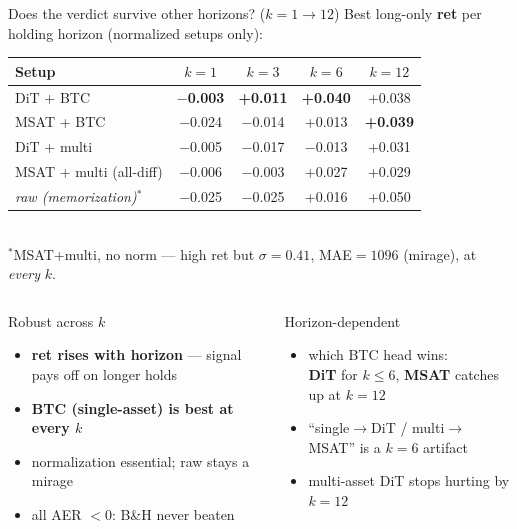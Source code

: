 \documentclass[10pt,aspectratio=169]{beamer}
\newcommand{\gd}[1]{\textbf{\textcolor{good}{#1}}}
\newcommand{\bd}[1]{\textcolor{bad}{#1}}
\begin{document}
\begin{frame}{Does the verdict survive other horizons? \hfill\normalfont\small($k{=}1\!\to\!12$)}
\centering\small
\setlength{\tabcolsep}{9pt}
Best long-only \textbf{ret} per holding horizon (normalized setups only):
\\[0.5em]
\begin{tabular}{@{}l cccc@{}}
\toprule
Setup & $k{=}1$ & $k{=}3$ & $k{=}6$ & $k{=}12$ \\ \midrule
DiT + BTC                & \gd{$-$0.003} & \gd{+0.011} & \gd{+0.040} & +0.038 \\
MSAT + BTC               & $-$0.024 & $-$0.014 & +0.013 & \gd{+0.039} \\
DiT + multi              & $-$0.005 & $-$0.017 & $-$0.013 & +0.031 \\
MSAT + multi (all-diff)  & $-$0.006 & $-$0.003 & +0.027 & +0.029 \\ \midrule
\emph{raw (memorization)}$^\ast$ & \bd{$-$0.025} & \bd{$-$0.025} & \bd{+0.016} & \bd{+0.050} \\
\bottomrule
\end{tabular}
\\[0.5em]
{\scriptsize $^\ast$MSAT+multi, no norm --- high ret but $\sigma{=}0.41$, MAE${=}1096$ (mirage), at \emph{every} $k$.}
\\[0.6em]
\begin{columns}[T]
\begin{block}{Robust across $k$}
\footnotesize
\begin{itemize}\itemsep1pt
\item \gd{ret rises with horizon} --- signal pays off on longer holds
\item \gd{BTC (single-asset) is best at every $k$}
\item normalization essential; raw stays a mirage
\item \bd{all AER $<0$}: B\&H never beaten
\end{itemize}
\end{block}
\begin{block}{Horizon-dependent}
\footnotesize
\begin{itemize}\itemsep1pt
\item which BTC head wins: \\ \gd{DiT} for $k\!\le\!6$, \gd{MSAT} catches up at $k{=}12$
\item ``single$\to$DiT / multi$\to$MSAT'' is a \bd{$k{=}6$ artifact}
\item multi-asset DiT stops hurting by $k{=}12$
\end{itemize}
\end{block}
\end{columns}
\end{frame}
\end{document}

